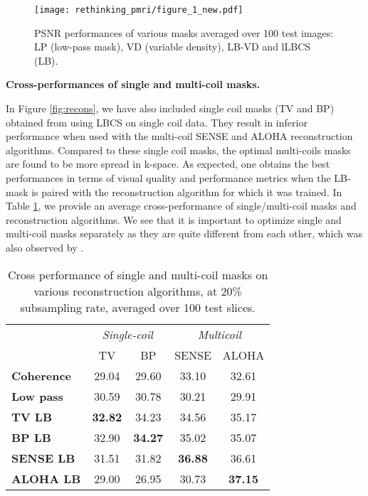 \begin{figure}[!ht]
    \hspace{4mm}
    \begin{minipage}[c]{.55\linewidth}
      \centering
      \texttt{[image: rethinking\_pmri/figure\_1\_new.pdf]}
    \end{minipage}
    \hfill
    \begin{minipage}[c]{0.3\linewidth}
        \centering
        \caption{PSNR performances of various masks averaged over 100 test images: LP (low-pass mask), VD (variable density), LB-VD and lLBCS (LB).}\label{fig:figu1}
    \end{minipage}    
\end{figure}
    
    \textbf{Cross-performances of single and multi-coil masks.}
    
    In Figure \ref{fig:recons}, we have also included single coil masks (TV and BP) obtained from using LBCS on single coil data. They result in inferior performance when used with the multi-coil SENSE and ALOHA reconstruction algorithms. Compared to these single coil masks, the optimal multi-coils masks are found to be more spread in k-space. As expected, one obtains the best performances in terms of visual quality and performance metrics when the LB-mask is paired with the reconstruction algorithm for which it was trained.  In Table \ref{tab:cross_recon}, we provide an average cross-performance of single/multi-coil masks and reconstruction algorithms. We see that it is important to optimize single and multi-coil masks separately as they are quite different from each other, which was also observed by \citet{haldar2019oedipus}.  %
    
    
    \begin{table} 
    \centering
 
    
    \begin{tabular}{>{\bfseries}lcccc}\hline
    \toprule
    \multirow{2}{*}{Mask} & \multicolumn{2}{c}{\textit{Single-coil}}  & \multicolumn{2}{c}{\textit{Multicoil}}  \\ 
      \cmidrule(l){2-3}\cmidrule(l){4-5}
      & TV & BP &SENSE&ALOHA  \\
      \midrule
    Coherence&29.04&29.60&33.10&32.61\\
    Low pass&30.59&30.78&30.21&29.91\\
    \midrule
    TV LB&{\bf32.82}&34.23&34.56&35.17\\
    BP LB&32.90&{\bf34.27}&35.02&35.07\\
    SENSE LB&31.51&31.82&{\bf36.88}&36.61\\
    ALOHA LB&29.00&26.95&30.73&{\bf37.15}\\
    \bottomrule
    \end{tabular}
    \caption{\label{tab:cross_recon} Cross performance of single and multi-coil masks on various reconstruction algorithms, at 20\% subsampling rate, averaged over 100 test slices.  }
    \end{table}
    

